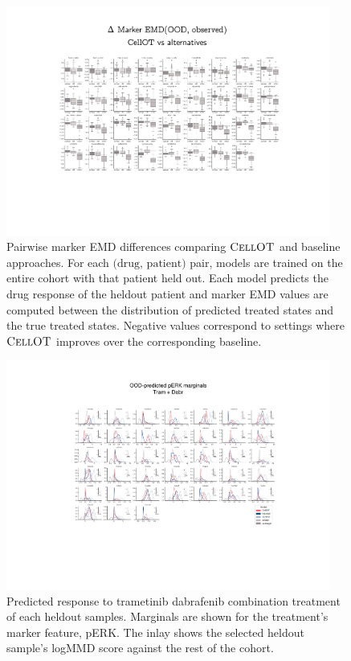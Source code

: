 \begin{figure}[h]
  \begin{center}
    \includegraphics[width=0.95\textwidth]{figures/cellot-cohort/ood-eval-marker.pdf}
  \end{center}
  \caption{
    Pairwise marker EMD differences comparing $\textsc{CellOT}$ and baseline approaches.
    For each $\text{(drug, patient)}$ pair, models are trained on the entire cohort with that patient held out.
    Each model predicts the drug response of the heldout patient
    and marker EMD values are computed between the distribution of predicted treated states and the true treated states.
    Negative values correspond to settings where $\textsc{CellOT}$ improves over the corresponding baseline.
  }
  \label{fig:ood-eval-marker}
\end{figure}

\begin{figure}
  \begin{center}
    \includegraphics[width=0.95\textwidth]{figures/cellot-cohort/ood-predict-marginals.pdf}
  \end{center}
  \caption{
    Predicted response to trametinib dabrafenib combination treatment of each heldout samples.
    Marginals are shown for the treatment's marker feature, pERK.
    The inlay shows the selected heldout sample's logMMD score against the rest of the cohort.
  }\label{fig:ood-predict-marginals}
\end{figure}

